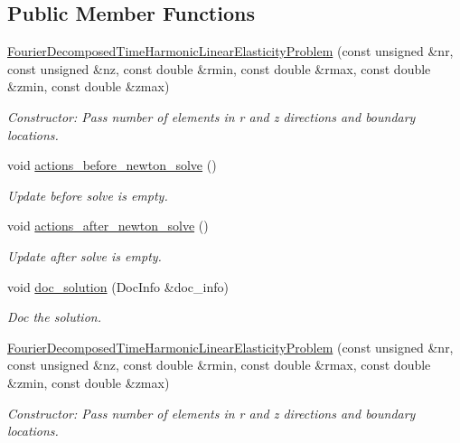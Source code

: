 \subsection*{Public Member Functions}
\begin{DoxyCompactItemize}
\item 
\hyperlink{classFourierDecomposedTimeHarmonicLinearElasticityProblem_a52597ec969cbd2aaa9fde263594c1c32}{Fourier\+Decomposed\+Time\+Harmonic\+Linear\+Elasticity\+Problem} (const unsigned \&nr, const unsigned \&nz, const double \&rmin, const double \&rmax, const double \&zmin, const double \&zmax)
\begin{DoxyCompactList}\small\item\em Constructor\+: Pass number of elements in r and z directions and boundary locations. \end{DoxyCompactList}\item 
void \hyperlink{classFourierDecomposedTimeHarmonicLinearElasticityProblem_ad9a3f48c3b399c4595f73d3f1e9a14ef}{actions\+\_\+before\+\_\+newton\+\_\+solve} ()
\begin{DoxyCompactList}\small\item\em Update before solve is empty. \end{DoxyCompactList}\item 
void \hyperlink{classFourierDecomposedTimeHarmonicLinearElasticityProblem_ac5c25fb4658eaef91104ef7be1b0d25e}{actions\+\_\+after\+\_\+newton\+\_\+solve} ()
\begin{DoxyCompactList}\small\item\em Update after solve is empty. \end{DoxyCompactList}\item 
void \hyperlink{classFourierDecomposedTimeHarmonicLinearElasticityProblem_af328e5b2260377fa7df04b727ca130bd}{doc\+\_\+solution} (Doc\+Info \&doc\+\_\+info)
\begin{DoxyCompactList}\small\item\em Doc the solution. \end{DoxyCompactList}\item 
\hyperlink{classFourierDecomposedTimeHarmonicLinearElasticityProblem_a52597ec969cbd2aaa9fde263594c1c32}{Fourier\+Decomposed\+Time\+Harmonic\+Linear\+Elasticity\+Problem} (const unsigned \&nr, const unsigned \&nz, const double \&rmin, const double \&rmax, const double \&zmin, const double \&zmax)
\begin{DoxyCompactList}\small\item\em Constructor\+: Pass number of elements in r and z directions and boundary locations. \end{DoxyCompactList}\item 

\end{DoxyCompactItemize}
